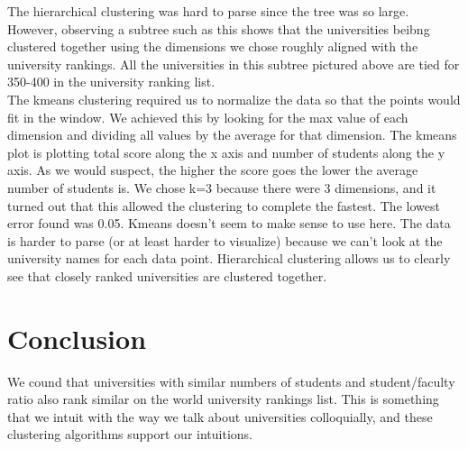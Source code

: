 \documentclass[11pt]{article}
\begin{document}
The hierarchical clustering was hard to parse since the tree was so large.  However, observing a subtree such as this shows that the universities beibng clustered together using the dimensions we chose roughly aligned with the university rankings.  All the universities in this subtree pictured above are tied for 350-400 in the university ranking list.\\

The kmeans clustering required us to normalize the data so that the points would fit in the window.  We achieved this by looking for the max value of each dimension and dividing all values by the average for that dimension.  The kmeans plot is plotting total score along the x axis and number of students along the y axis.  As we would suspect, the higher the score goes the lower the average number of students is.  We chose k=3 because there were 3 dimensions, and it turned out that this allowed the clustering to complete the fastest.  The lowest error found was 0.05.  Kmeans doesn't seem to make sense to use here.  The data is harder to parse (or at least harder to visualize) because we can't look at the university names for each data point.  Hierarchical clustering allows us to clearly see that closely ranked universities are clustered together.

\section{Conclusion}

We cound that universities with similar numbers of students and student/faculty ratio also rank similar on the world university rankings list.  This is something that we intuit with the way we talk about universities colloquially, and these clustering algorithms support our intuitions.
\end{document}
